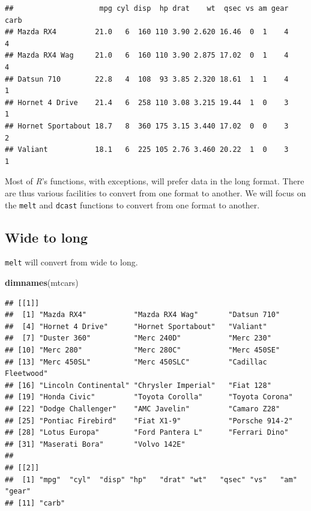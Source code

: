 \documentclass[]{book}
\newenvironment{Shaded}{\begin{snugshade}}{\end{snugshade}}
\newcommand{\KeywordTok}[1]{\textcolor[rgb]{0.13,0.29,0.53}{\textbf{#1}}}
\newcommand{\NormalTok}[1]{#1}
\theoremstyle{definition}
\theoremstyle{definition}
\theoremstyle{definition}
\theoremstyle{remark}
\begin{document}
\begin{verbatim}
##                    mpg cyl disp  hp drat    wt  qsec vs am gear carb
## Mazda RX4         21.0   6  160 110 3.90 2.620 16.46  0  1    4    4
## Mazda RX4 Wag     21.0   6  160 110 3.90 2.875 17.02  0  1    4    4
## Datsun 710        22.8   4  108  93 3.85 2.320 18.61  1  1    4    1
## Hornet 4 Drive    21.4   6  258 110 3.08 3.215 19.44  1  0    3    1
## Hornet Sportabout 18.7   8  360 175 3.15 3.440 17.02  0  0    3    2
## Valiant           18.1   6  225 105 2.76 3.460 20.22  1  0    3    1
\end{verbatim}

Most of \emph{R}'s functions, with exceptions, will prefer data in the
long format. There are thus various facilities to convert from one
format to another. We will focus on the \texttt{melt} and \texttt{dcast}
functions to convert from one format to another.

\subsection{Wide to long}\label{wide-to-long}

\texttt{melt} will convert from wide to long.

\begin{Shaded}
\begin{Highlighting}[]
\KeywordTok{dimnames}\NormalTok{(mtcars)}
\end{Highlighting}
\end{Shaded}

\begin{verbatim}
## [[1]]
##  [1] "Mazda RX4"           "Mazda RX4 Wag"       "Datsun 710"         
##  [4] "Hornet 4 Drive"      "Hornet Sportabout"   "Valiant"            
##  [7] "Duster 360"          "Merc 240D"           "Merc 230"           
## [10] "Merc 280"            "Merc 280C"           "Merc 450SE"         
## [13] "Merc 450SL"          "Merc 450SLC"         "Cadillac Fleetwood" 
## [16] "Lincoln Continental" "Chrysler Imperial"   "Fiat 128"           
## [19] "Honda Civic"         "Toyota Corolla"      "Toyota Corona"      
## [22] "Dodge Challenger"    "AMC Javelin"         "Camaro Z28"         
## [25] "Pontiac Firebird"    "Fiat X1-9"           "Porsche 914-2"      
## [28] "Lotus Europa"        "Ford Pantera L"      "Ferrari Dino"       
## [31] "Maserati Bora"       "Volvo 142E"         
## 
## [[2]]
##  [1] "mpg"  "cyl"  "disp" "hp"   "drat" "wt"   "qsec" "vs"   "am"   "gear"
## [11] "carb"
\end{verbatim}
\end{document}
